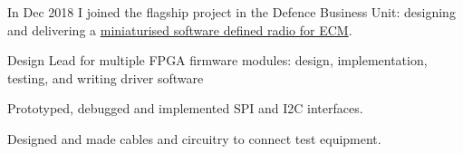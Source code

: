 {}
In Dec 2018 I joined the flagship project in the Defence Business Unit: designing and delivering a \href{https://roke.co.uk/innovations/protecting-personnel-from-ieds}{miniaturised software defined radio for ECM}.
\vspace{0.25em}
\begin{tightemize}
  \item Design Lead for multiple FPGA firmware modules: design, implementation, testing, and writing driver software
  \item Prototyped, debugged and implemented SPI and I2C interfaces.
  \item Designed and made cables and circuitry to connect test equipment.
\end{tightemize}


\sectionsep
